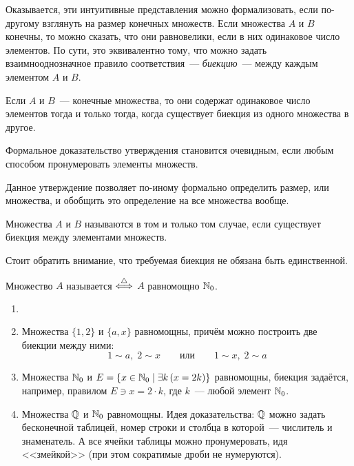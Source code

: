 Оказывается, эти интуитивные представления можно формализовать, если по-другому взглянуть на размер конечных множеств.
Если множества $ A $ и $ B $ конечны, то можно сказать, что они равновелики, если в них одинаковое число элементов.
По сути, это эквивалентно тому, что можно задать взаимнооднозначное правило соответствия~--- \textit{биекцию}~--- между каждым элементом $ A $ и $ B $.

\begin{statement}
    \label{statement:functions:finite_bijection}
    Если $ A $ и $ B $~--- конечные множества, то они содержат одинаковое число элементов тогда и только тогда,
    когда существует биекция из одного множества в другое.
\end{statement}

Формальное доказательство утверждения становится очевидным, если любым способом пронумеровать элементы множеств.

Данное утверждение позволяет по-иному формально определить размер, или  множества, и обобщить это определение на все множества вообще.
\begin{definition}
    Множества $ A $ и $ B $ называются  в том и только том случае,
    если существует биекция между элементами множеств.
\end{definition}
Стоит обратить внимание, что требуемая биекция не обязана быть единственной.

\begin{definition}
    Множество $ A $ называется  $ \overset{\triangle}{\Longleftrightarrow} $ $ A $ равномощно $ \mathbb{N}_0 $.
\end{definition}

\begin{example}
    \begin{enumerate}
        \item[]
        \item
            Множества $ \{1, 2\} $ и $ \{a, x\} $ равномощны, причём можно построить две биекции между ними:
            \[
                1 \sim a, \; 2 \sim x \qquad \text{или} \qquad 1 \sim x, \; 2 \sim a
            \]
        \item
            Множества $ \mathbb{N}_0 $ и $ E = \{ x \in \mathbb{N}_0 \mid \exists k \, (x = 2k) \} $ равномощны, биекция задаётся, например, правилом $ E \ni x = 2 \cdot k $, где $ k $~--- любой элемент $ \mathbb{N}_0 $.
        \item
            Множества $ \mathbb{Q} $ и $ \mathbb{N}_0 $ равномощны.
            Идея доказательства: $ \mathbb{Q} $ можно задать бесконечной таблицей, номер строки и столбца в которой~--- числитель и знаменатель.
            А все ячейки таблицы можно пронумеровать, идя <<змейкой>> (при этом сократимые дроби не нумеруются).
    \end{enumerate}
\end{example}

